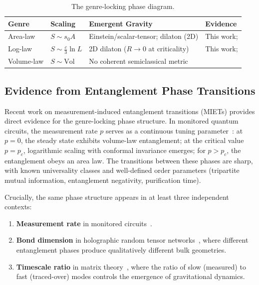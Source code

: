 \documentclass[aps,prd,twocolumn,superscriptaddress,nofootinbib,floatfix]{revtex4-2}
\newcommand{\sn}{s_0}
\begin{document}
\begin{table}[ht!]
\centering
\begin{tabular}{@{}p{1.5cm}p{1.2cm}p{2.2cm}p{2.0cm}@{}}
\toprule
Genre & Scaling & Emergent Gravity & Evidence \\
\midrule
Area-law & $S \sim \sn A$ & Einstein/scalar-tensor; dilaton (2D) & This work; \cite{Jacobson2016,Faulkner2014} \\
Log-law & $S \sim \frac{c}{3}\ln L$ & 2D dilaton ($R \to 0$ at criticality) & This work; \cite{CallebautVerlinde2018} \\
Volume-law & $S \sim \mathrm{Vol}$ & No coherent semiclassical metric & \cite{VasseurPotterYouLudwig2019,LiChenFisher2018,Pastawski2015} \\
\bottomrule
\end{tabular}
\caption{The genre-locking phase diagram.}
\label{tab:genres}
\end{table}

\subsection{Evidence from Entanglement Phase Transitions}

Recent work on measurement-induced entanglement transitions (MIETs) provides direct evidence for the genre-locking phase structure. In monitored quantum circuits, the measurement rate $p$ serves as a continuous tuning parameter~\cite{LiChenFisher2018,GranetNahum2023}: at $p = 0$, the steady state exhibits volume-law entanglement; at the critical value $p = p_c$, logarithmic scaling with conformal invariance emerges; for $p > p_c$, the entanglement obeys an area law. The transitions between these phases are sharp, with known universality classes and well-defined order parameters (tripartite mutual information, entanglement negativity, purification time).

Crucially, the same phase structure appears in at least three independent contexts:
\begin{enumerate}
\item \textbf{Measurement rate} in monitored circuits~\cite{LiChenFisher2018,GranetNahum2023}.
\item \textbf{Bond dimension} in holographic random tensor networks~\cite{VasseurPotterYouLudwig2019}, where different entanglement phases produce qualitatively different bulk geometries.
\item \textbf{Timescale ratio} in matrix theory~\cite{Sahakian2025}, where the ratio of slow (measured) to fast (traced-over) modes controls the emergence of gravitational dynamics.
\end{enumerate}
\end{document}
